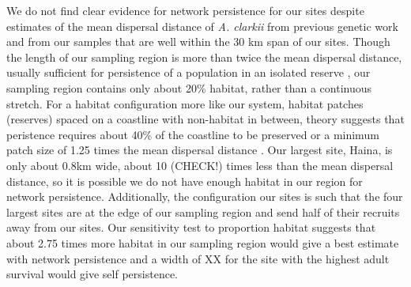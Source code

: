 \documentclass[12pt, oneside]{article}   	%
\begin{document}

We do not find clear evidence for network persistence for our sites despite estimates of the mean dispersal distance of \textit{A. clarkii} from previous genetic work \citep[11 km,][]{pinsky2010using} and from our samples \citep{catalanoInPrepconnectivity} that are well within the 30 km span of our sites. Though the length of our sampling region is more than twice the mean dispersal distance, usually sufficient for persistence of a population in an isolated reserve \citep[e.g.][]{lockwood2002effects}, our sampling region contains only about 20\% habitat, rather than a continuous stretch. For a habitat configuration more like our system, habitat patches (reserves) spaced on a coastline with non-habitat in between, theory suggests that peristence requires about 40\% of the coastline to be preserved or a minimum patch size of 1.25 times the mean dispersal distance \citep{lockwood2002effects}. Our largest site, Haina, is only about 0.8km wide, about 10 (CHECK!) times less than the mean dispersal distance, so it is possible we do not have enough habitat in our region for network persistence. Additionally, the configuration our sites is such that the four largest sites are at the edge of our sampling region and send half of their recruits away from our sites. Our sensitivity test to proportion habitat suggests that about 2.75 times more habitat in our sampling region would give a best estimate with network persistence and a width of XX for the site with the highest adult survival would give self persistence. 
\end{document}
